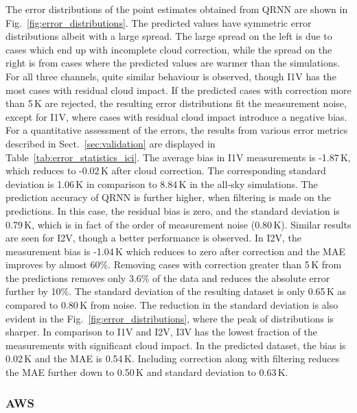 \documentclass[amt, manuscript]{copernicus}
\begin{document}
The error distributions of the point estimates obtained from QRNN are shown in Fig.~\ref{fig:error_distributions}. The predicted values have symmetric error distributions albeit with a large spread. The large spread on the left is due to cases which end up with incomplete cloud correction, while the spread on the right is from cases where the predicted values are warmer than the simulations. For all three channels, quite similar behaviour is observed, though I1V has the most cases with residual cloud impact. If the predicted cases with correction more than 5\,K are rejected, the resulting error distributions fit the measurement noise, except for I1V, where cases with residual cloud impact introduce a negative bias. For a quantitative assessment of the errors, the results from various error metrics described in  Sect.~\ref{sec:validation} are displayed in Table~\ref{tab:error_statistics_ici}. The average bias in I1V measurements is -1.87\,K, which reduces to -0.02\,K after cloud correction. The corresponding standard deviation is 1.06\,K in comparison to 8.84\,K in the all-sky simulations. The prediction accuracy of QRNN is further higher, when filtering is made on the predictions. In this case, the residual bias is zero, and the standard deviation is 0.79\,K, which is in fact of the order of measurement noise (0.80\,K). Similar results are seen for I2V, though a better performance is observed. In I2V, the measurement bias is -1.04\,K which reduces to zero after correction and the MAE improves by almost 60\%. Removing cases with correction greater than 5\,K from the predictions removes only 3.6\% of the data and reduces the absolute error further by 10\%. The standard deviation of the resulting dataset is only 0.65\,K as compared to 0.80\,K from noise. The reduction in the standard deviation is also evident in the Fig.~\ref{fig:error_distributions}, where the peak of distributions is sharper. In comparison to I1V and I2V, I3V has the lowest fraction of the measurements with significant cloud impact. In the predicted dataset, the bias is 0.02\,K and the MAE is 0.54\,K. Including correction along with filtering reduces the MAE further down to 0.50\,K and standard deviation to 0.63\,K.  

\subsubsection{AWS}
\end{document}
